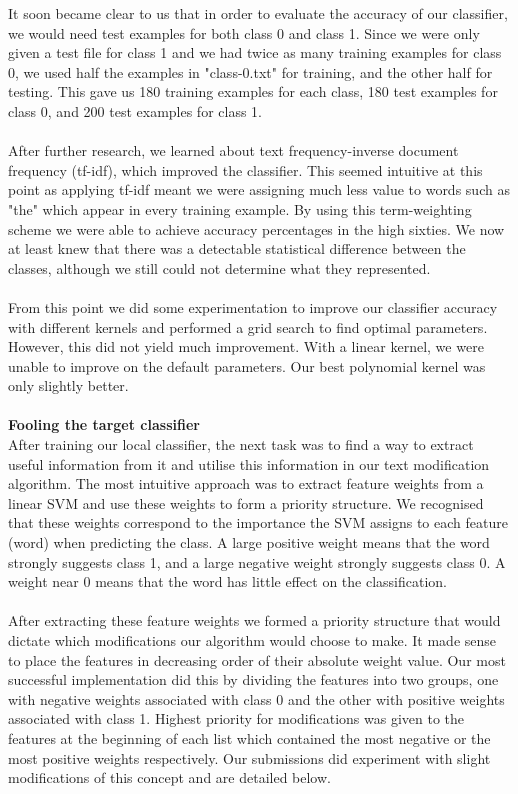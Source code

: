 \documentclass{article}
\begin{document}
It soon became clear to us that in order to evaluate the accuracy of our classifier, we would need test examples for both class 0 and class 1. Since we were only given a test file for class 1 and we had twice as many training examples for class 0, we used half the examples in "class-0.txt" for training, and the other half for testing. This gave us 180 training examples for each class, 180 test examples for class 0, and 200 test examples for class 1. \\ \\
After further research, we learned about text frequency-inverse document frequency (tf-idf), which improved the classifier. This seemed intuitive at this point as applying tf-idf meant we were assigning much less value to words such as "the" which appear in every training example. By using this term-weighting scheme we were able to achieve accuracy percentages in the high sixties. We now at least knew that there was a detectable statistical difference between the classes, although we still could not determine what they represented. \\ \\
From this point we did some experimentation to improve our classifier accuracy with different kernels and performed a grid search to find optimal parameters. However, this did not yield much improvement. With a linear kernel, we were unable to improve on the default parameters. Our best polynomial kernel was only slightly better. \\ \\
\textbf{\large Fooling the target classifier} \\
After training our local classifier, the next task was to find a way to extract useful information from it and utilise this information in our text modification algorithm. The most intuitive approach was to extract feature weights from a linear SVM and use these weights to form a priority structure. We recognised that these weights correspond to the importance the SVM assigns to each feature (word) when predicting the class. A large positive weight means that the word strongly suggests class 1, and a large negative weight strongly suggests class 0. A weight near 0 means that the word has little effect on the classification. \\ \\
After extracting these feature weights we formed a priority structure that would dictate which modifications our algorithm would choose to make. It made sense to place the features in decreasing order of their absolute weight value. Our most successful implementation did this by dividing the features into two groups, one with negative weights associated with class 0 and the other with positive weights associated with class 1. Highest priority for modifications was given to the features at the beginning of each list which contained the most negative or the most positive weights respectively. Our submissions did experiment with slight modifications of this concept and are detailed below. \\ \\
\end{document}
